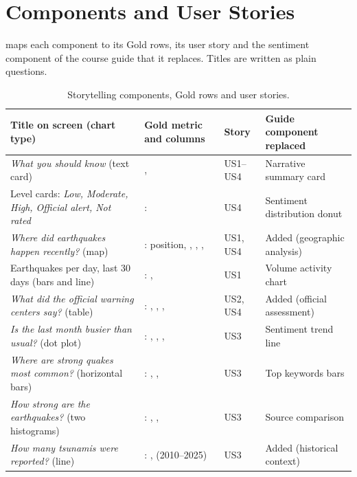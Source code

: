 \documentclass[a4paper,11pt,oneside]{book}
\renewcommand{\arraystretch}{1.25}
\begin{document}
\section{Components and User Stories}
 maps each component to its Gold rows, its user story and the sentiment component of the course guide that it replaces. Titles are written as plain questions.

\begin{table}[!ht]
\centering
\footnotesize
\setlength{\tabcolsep}{4pt}
\renewcommand{\arraystretch}{1.03}
\captionsetup{skip=5pt}
\begin{tabularx}{\textwidth}{@{}YL{3.9cm}L{1.1cm}L{2.5cm}@{}}
\toprule
Title on screen (chart type) & Gold metric and columns & Story & Guide component replaced \\
\midrule
\emph{What you should know} (text card) & ,  & US1--US4 & Narrative summary card \\
Level cards: \emph{Low, Moderate, High, Official alert, Not rated} & :  & US4 & Sentiment distribution donut \\
\emph{Where did earthquakes happen recently?} (map) & : position, , , ,  & US1, US4 & Added (geographic analysis) \\
 Earthquakes per day, last 30 days (bars and line) & : ,  & US1 & Volume activity chart \\
\emph{What did the official warning centers say?} (table) & : , , ,  & US2, US4 & Added (official assessment) \\
\emph{Is the last month busier than usual?} (dot plot) & : , , ,  & US3 & Sentiment trend line \\
\emph{Where are strong quakes most common?} (horizontal bars) & : , ,  & US3 & Top keywords bars \\
\emph{How strong are the earthquakes?} (two histograms) & : , ,  & US3 & Source comparison \\
\emph{How many tsunamis were reported?} (line) & : ,  (2010--2025) & US3 & Added (historical context) \\
\bottomrule
\end{tabularx}
\caption{Storytelling components, Gold rows and user stories.}
\label{tab:story-components}
\end{table}
\end{document}
